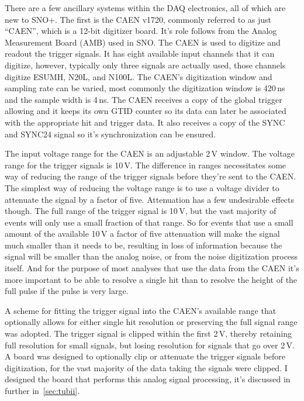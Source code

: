 There are a few ancillary systems within the DAQ electronics, all
of which are new to SNO+.
The first is the CAEN v1720, commonly
referred to as just ``CAEN'', which is a 12-bit digitizer board.
It's role follows from the Analog Measurement Board (AMB) used in
SNO.
The CAEN is used to digitize and readout the trigger signals.
It has eight available input channels that it can digitize, however,
typically only three signals are actually used, those channels digitize ESUMH, N20L, and
N100L. The CAEN's digitization window and sampling rate can be varied,
most commonly the digitization window is 420\,ns and the sample width
is 4\,ns. The CAEN receives a copy of the global trigger allowing and
it keeps its own GTID counter so its data can later be associated
with the appropriate hit and trigger data. It also receives a copy of the
SYNC and SYNC24 signal so it's synchronization can be ensured.

The input voltage range for the CAEN is an adjustable 2\,V window.
The voltage range for the trigger signals is 10\,V.
The difference in ranges necessitates some way of reducing the range of the trigger signals
before they're sent to the CAEN\@.
The simplest way of reducing the voltage range is to use a voltage
divider to attenuate the signal by a factor of five.
Attenuation has a few undesirable effects though.
The full range of the trigger signal is 10\,V, but the vast
majority of events will only use a small fraction of that range.
So for events that use a small amount of the available 10\,V a factor
of five attenuation will make the signal much smaller than it needs to be,
resulting in loss of information because the signal will be smaller than
the analog noise, or from the noise digitization process itself.
And for the purpose of most analyses that use the data from the CAEN
it's more important to be able to resolve a single hit than to resolve
the height of the full pulse if the pulse is very large.

A scheme for fitting the trigger signal into the CAEN's available range that
optionally allows for either single hit resolution or preserving the full
signal range was adopted.
The trigger signal is clipped within the first 2\,V, thereby retaining full
resolution for small signals, but losing resolution for signals that go over
2\,V.
A board was designed to optionally clip or attenuate the trigger signals
before digitization, for the vast majority of the data taking the signals
were clipped.
I designed the board that performs this analog signal processing,
it's discussed in further in~\ref{sec:tubii}.

